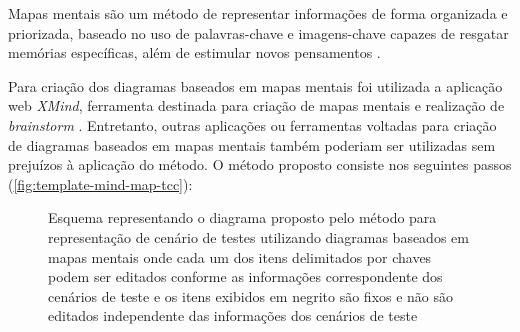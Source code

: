             Mapas mentais são um método de representar informações de forma organizada e priorizada, baseado no uso de palavras-chave e imagens-chave capazes de resgatar memórias específicas, além de estimular novos pensamentos \cite{Buzan2009}.
 
            Para criação dos diagramas baseados em mapas mentais foi utilizada a aplicação web \emph{XMind}, ferramenta destinada para criação de mapas mentais e realização de \emph{brainstorm} \cite{XMind2022}. Entretanto, outras aplicações ou ferramentas voltadas para criação de diagramas baseados em mapas mentais também poderiam ser utilizadas sem prejuízos à aplicação do método. O método proposto consiste nos seguintes passos (\autoref{fig:template-mind-map-tcc}):
            
            \begin{figure}[!htb]
                \centering
	            \begin{minipage}{\wd0}
		            \caption{ Esquema representando o diagrama proposto pelo método para representação de cenário de testes utilizando diagramas baseados em mapas mentais onde cada um dos itens delimitados por chaves podem ser editados conforme as informações correspondente dos cenários de teste e os itens exibidos em negrito são fixos e não são editados independente das informações dos cenários de teste
		            }  
		            \label{fig:template-mind-map-tcc}
	            \end{minipage}
            \end{figure}

